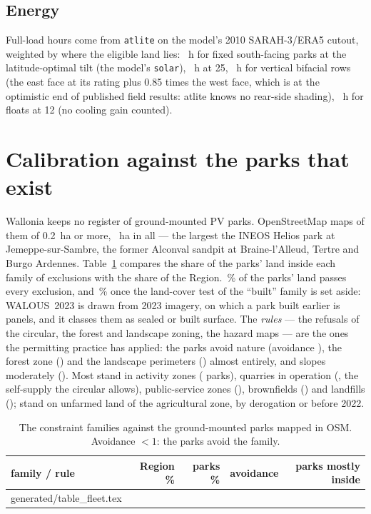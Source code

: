 \documentclass[11pt,a4paper]{article}
\makeatletter
\newcommand{\tablefile}[1]{\@@input #1 }
\makeatother
\begin{document}
\subsection{Energy}

Full-load hours come from \texttt{atlite} on the model's 2010 SARAH-3/ERA5
cutout, weighted by where the eligible land lies: \FlhGround{}~h for fixed
south-facing parks at the latitude-optimal tilt (the model's \texttt{solar}),
\FlhAgrivoltaicGrazing{}~h at 25\textdegree{}, \FlhAgrivoltaicCrops{}~h for vertical bifacial
rows (the east face at its rating plus 0.85 times the west face, which is at the
optimistic end of published field results: atlite knows no rear-side shading),
\FlhFloating{}~h for floats at 12\textdegree{} (no cooling gain counted).

\section{Calibration against the parks that exist}\label{sec:fleet}

Wallonia keeps no register of ground-mounted PV parks. OpenStreetMap maps
\FleetN{} of them of 0.2~ha or more, \FleetHa{}~ha in all --- the largest the
INEOS Helios park at Jemeppe-sur-Sambre, the former Alconval sandpit at
Braine-l'Alleud, Tertre and Burgo Ardennes. Table~\ref{tab:fleet} compares the
share of the parks' land inside each family of exclusions with the share of the
Region. \FleetEligPct{}\,\% of the parks' land passes every exclusion, and
\FleetEligRulesPct{}\,\% once the land-cover test of the ``built'' family is
set aside: WALOUS~2023 is drawn from 2023 imagery, on which a park built earlier
is panels, and it classes them as sealed or built surface. The \emph{rules}
--- the refusals of the circular, the forest and landscape zoning, the hazard
maps --- are the ones the permitting practice has applied: the parks avoid
nature (avoidance \FleetAvoidNature{}), the forest zone (\FleetAvoidForest{})
and the landscape perimeters (\FleetAvoidLandscape{}) almost entirely, and slopes
moderately (\FleetAvoidTerrain{}). Most stand in activity zones
(\FleetOnZaeN{} parks), quarries in operation (\FleetOnQuarryActiveN{}, the
self-supply the circular allows), public-service zones (\FleetOnZspecN{}),
brownfields (\FleetOnSarN{}) and landfills (\FleetOnCetN{}); \FleetOnAgriZoneUnfarmedN{}
stand on unfarmed land of the agricultural zone, by derogation or before 2022.

\begin{table}[htbp]
\centering\small
\caption{The constraint families against the ground-mounted parks mapped in
OSM. Avoidance $<1$: the parks avoid the family.}\label{tab:fleet}
\begin{tabular}{lrrrr}
\toprule
family / rule & Region \% & parks \% & avoidance & parks mostly inside \\
\midrule
\tablefile{generated/table_fleet.tex}
\bottomrule
\end{tabular}
\end{table}
\end{document}
